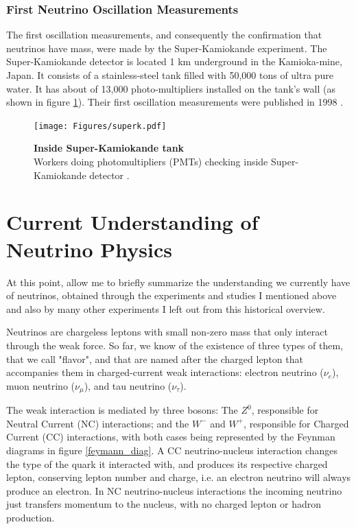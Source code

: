 \subsubsection{First Neutrino Oscillation Measurements}
The first oscillation measurements, and consequently the confirmation that neutrinos have mass, were made by the Super-Kamiokande experiment. The Super-Kamiokande detector is located 1 km underground in the Kamioka-mine, Japan. It consists of a stainless-steel tank filled with 50,000 tons of ultra pure water. It has about of 13,000 photo-multipliers installed on the tank's wall (as shown in figure \ref{superk_picture}). Their first oscillation measurements were published in 1998 \cite{first_kamioka_measure}.
%
\begin{figure}[h!]
	\begin{center}
		\texttt{[image: Figures/superk.pdf]}
		\caption[Inside Super-Kamiokande tank]{ {\textbf{Inside Super-Kamiokande tank}}\\Workers doing photomultipliers (PMTs) checking inside Super-Kamiokande detector \cite{superk_picture}.}
		\label{superk_picture}	
	\end{center}
\end{figure}
%

\section{Current Understanding of Neutrino Physics}

At this point, allow me to briefly summarize the understanding we currently have of neutrinos, obtained through the experiments and studies I mentioned above and also by many other experiments I left out from this historical overview. 

Neutrinos are chargeless leptons with small non-zero mass that only interact through the weak force. So far, we know of the existence of three types of them, that we call "flavor", and that are named after the charged lepton that accompanies them in charged-current weak interactions: electron neutrino ($\nu_e$), muon neutrino ($\nu_{\mu}$), and tau neutrino ($\nu_{\tau}$). 

The weak interaction is mediated by three bosons: The $Z^{0}$, responsible for Neutral Current (NC) interactions; and the $W^{-}$ and $W^{+}$, responsible for Charged Current (CC) interactions, with both cases being represented by the Feynman diagrams in figure \ref{feymann_diag}. A CC neutrino-nucleus interaction changes the type of the quark it interacted with, and produces its respective charged lepton, conserving lepton number and charge, i.e. an electron neutrino will always produce an electron. In NC neutrino-nucleus interactions the incoming neutrino just transfers momentum to the nucleus, with no charged lepton or hadron production.

